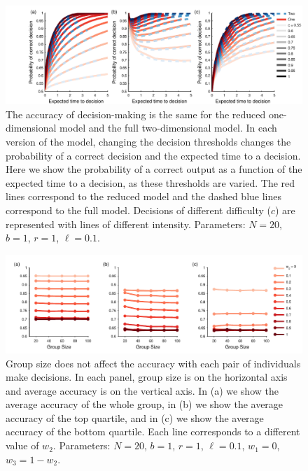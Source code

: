 \documentclass{article}
\begin{document}
\begin{figure}[ht]
\includegraphics[width=\textwidth]{dimensionality_comparison.pdf}
\caption{\label{dimensionality} The accuracy of decision-making is the same for the reduced one-dimensional model and the full two-dimensional model. In each version of the model, changing the decision thresholds changes the probability of a correct decision and the expected time to a decision. Here we show the probability of a correct output as a function of the expected time to a decision, as these thresholds are varied. The red lines correspond to the reduced model and the dashed blue lines correspond to the full model. Decisions of different difficulty ($c$) are represented with lines of different intensity. Parameters: $N=20$, $b=1$, $r=1$, $\ell=0.1$.}
\end{figure}

\begin{figure}[ht]
\includegraphics[width=6.83in]{group_size.pdf}
\caption{\label{groupsize} Group size does not affect the accuracy with each pair of individuals make decisions. In each panel, group size is on the horizontal axis and average accuracy is on the vertical axis. In (a) we show the average accuracy of the whole group, in (b) we show the average accuracy of the top quartile, and in (c) we show the average accuracy of the bottom quartile. Each line corresponds to a different value of $w_2$. Parameters: $N=20$, $b=1$, $r=1$, $\ell=0.1$, $w_1=0$, $w_3=1-w_2$.}
\end{figure}
\end{document}
